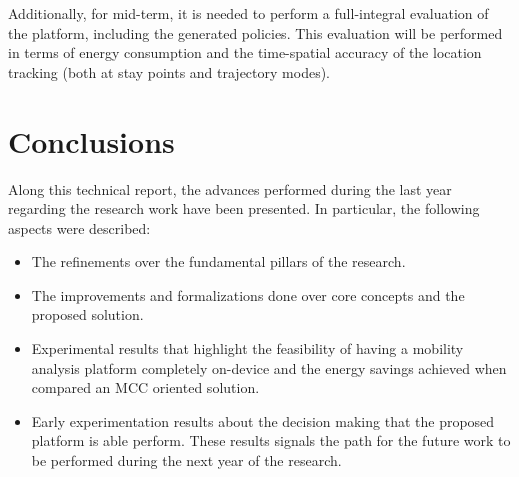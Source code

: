 \documentclass[ENG,PhD]{cinvestav}
\begin{document}
Additionally, for mid-term, it is needed to perform a full-integral evaluation of the platform, including the generated policies.
This evaluation will be performed in terms of energy consumption and the time-spatial accuracy of the location tracking (both at stay points and trajectory modes).





%                                                                                          
\section{Conclusions}\label{sec:conclusions}
Along this technical report, the advances performed during the last year regarding the research work have been presented.
In particular, the following aspects were described:
\begin{itemize}
  \item The refinements over the fundamental pillars of the research.
  \item The improvements and formalizations done over core concepts and the proposed solution.
  \item Experimental results that highlight the feasibility of having a mobility analysis platform completely on-device and the energy savings achieved when compared an MCC oriented solution.
  \item Early experimentation results about the decision making that the proposed platform is able perform.
  These results signals the path for the future work to be performed during the next year of the research.
\end{itemize}



\end{document}
